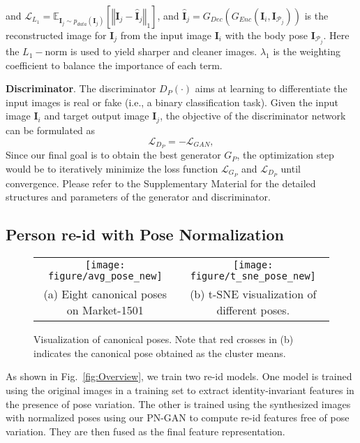 \documentclass[10pt,letterpaper,twocolumn,10pt,letterpaper,twocolumn]{article}
\providecommand{\tabularnewline}{\\}
\begin{document}
\noindent and $\mathcal{L}_{L_{1}}=\mathbb{E}_{\mathbf{I}_{j}\sim p_{data}\left(\mathbf{I}_{j}\right)}\left[\left\Vert \mathbf{I}_{j}-\hat{\mathbf{I}}_{j}\right\Vert _{1}\right]$,
and $\hat{\mathbf{I}}_{j}=G_{Dec}\left(G_{Enc}\left(\mathbf{I}_{i},\mathbf{I}_{\mathcal{P}_{j}}\right)\right)$
is the reconstructed image for $\mathbf{I}_{j}$ from the input image
$\mathbf{I}_{i}$ with the body pose $\mathbf{I}_{\mathcal{P}_{j}}$.
Here the $L_{1}-$norm is used to yield sharper and cleaner images.
$\lambda_{1}$ is the weighting coefficient to balance the importance
of each term.

\vspace{0.03in}

\noindent \textbf{Discriminator}. The discriminator $D_{P}\left(\cdot\right)$
aims at learning to differentiate the input images is real or fake
(i.e., a binary classification task). Given the input image $\mathbf{I}_{i}$
and target output image $\mathbf{I}_{j}$, the objective of the discriminator
network can be formulated as 
\begin{equation}
\mathcal{L}_{D_{P}}=-\mathcal{L}_{GAN},\label{eq:discriminator}
\end{equation}
Since our final goal is to obtain the best generator $G_{P}$, the
optimization step would be to iteratively minimize the loss function
$\mathcal{L}_{G_{P}}$ and $\mathcal{L}_{D_{P}}$ until convergence.
Please refer to the Supplementary Material for the detailed structures
and parameters of the generator and discriminator.

\subsection{Person re-id with Pose Normalization \label{subsec:person-re-id-classification}}

\begin{figure*}
\centering{}\begin{tabular}{cc}
\texttt{[image: figure/avg\_pose\_new]}  & \texttt{[image: figure/t\_sne\_pose\_new]}\tabularnewline
(a) Eight canonical poses on Market-1501  & (b) t-SNE visualization of different poses.\tabularnewline
\end{tabular}\caption{\label{fig:The-eight-poses} Visualization of canonical poses. Note
that red crosses in (b) indicates the canonical pose obtained as the cluster means.}
\end{figure*}

As shown in Fig.~\ref{fig:Overview}, we train two re-id models.
One model is trained using the original images in a training set to
extract identity-invariant features in the presence of pose variation.
The other is trained using the synthesized images with normalized
poses using our PN-GAN to compute re-id features free of pose variation.
They are then fused as the final feature representation.
\end{document}
